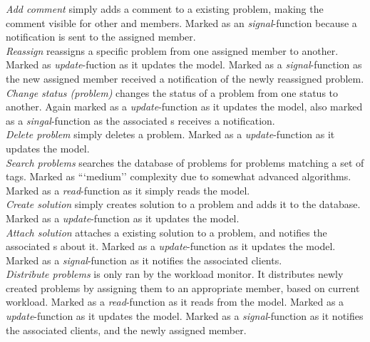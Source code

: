 \emph{Add comment} simply adds a comment to a existing problem, making the comment visible for other \client and \astaff[] members. Marked as an \textit{signal}-function because a notification is sent to the assigned \astaff[] member.  \\
\emph{Reassign} reassigns a specific problem from one assigned \astaff[] member to another. Marked as \textit{update}-fuction as it updates the model. Marked as a \textit{signal}-function as the new assigned \astaff[] member received a notification of the newly reassigned problem. \\
\emph{Change status (problem)} changes the status of a problem from one status to another. Again marked as a \textit{update}-function as it updates the model, also marked as a \textit{singal}-function as the associated \client s receives a notification. \\
\emph{Delete problem} simply deletes a problem. Marked as a \textit{update}-function as it updates the model. \\
\emph{Search problems} searches the database of problems for problems matching a set of tags. Marked as ```medium'' complexity due to somewhat advanced algorithms. Marked as a \textit{read}-function as it simply reads the model.\\
\emph{Create solution} simply creates solution to a problem and adds it to the database. Marked as a \textit{update}-function as it updates the model. \\
\emph{Attach solution} attaches a existing solution to a problem, and notifies the associated \client s about it. Marked as a \textit{update}-function as it updates the model. Marked as a \textit{signal}-function as it notifies the associated clients. \\
\emph{Distribute problems} is only ran by the workload monitor. It distributes newly created problems by assigning them to an appropriate \astaff[] member, based on current workload. %
 Marked as a \textit{read}-function as it reads from the model. Marked as a \textit{update}-function as it updates the model. Marked as a \textit{signal}-function as it notifies the associated clients, and the newly assigned \astaff[] member. \\
